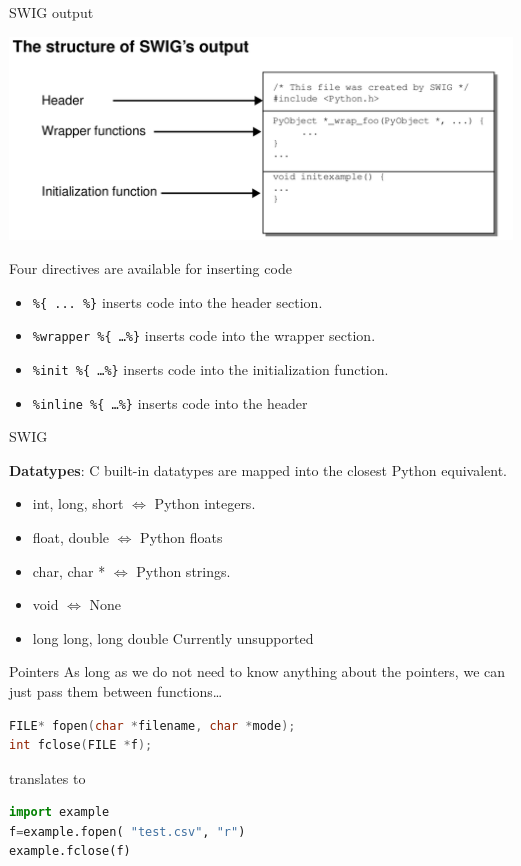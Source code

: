 \documentclass[german]{beamer}
\newcommand{\ra}{\text{$\rightarrow$}}
\begin{document}
\begin{frame}{SWIG output}

{\centering
\includegraphics[width=.9\textwidth]{pics/swigoutput}}

Four directives are available for inserting code
\begin{itemize}
\item {\tt \%\{ ... \%\}} inserts code into the header section.
\item {\tt \%wrapper \%\{ \ldots \%\}} inserts code into the wrapper section.
\item {\tt \%init \%\{ \ldots \%\}} inserts code into the initialization function.
\item {\tt \%inline \%\{ \ldots \%\}} inserts code into the header
\end{itemize}
\end{frame}

\begin{frame}{SWIG}

{\bf Datatypes}: C built-in datatypes are mapped into the closest
Python equivalent.

\begin{itemize}
\item int, long, short $\Leftrightarrow$ Python integers.
\item float, double $\Leftrightarrow$ Python floats
\item char, char * $\Leftrightarrow$ Python strings.
\item void $\Leftrightarrow$ None
\item long long, long double \ra Currently unsupported
\end{itemize}

\end{frame}


\begin{frame}[fragile]{Pointers}
As long as we do not need to know anything about the pointers, we can
just pass them between functions\ldots

\begin{lstlisting}[language=C,caption=example.i]
%module example
FILE* fopen(char *filename, char *mode);
int fclose(FILE *f);
\end{lstlisting}
translates to
\begin{lstlisting}[language=python,caption=testexample.py]
import example
f=example.fopen( "test.csv", "r")
example.fclose(f)
\end{lstlisting}
\end{frame}
\end{document}
